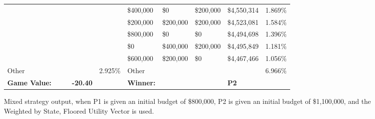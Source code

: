 \documentclass[11pt]{article}
\begin{document}
\begin{figure}
\begin{tabular}{ |p{1.0cm}p{1.0cm}p{1.0cm}p{2.0cm}|p{1.0cm}||p{1.0cm}p{1.0cm}p{1.0cm}p{2.0cm}|p{1.0cm}|}
&&&&                                                & \$400,000 & \$0& \$200,000 & \$4,550,314  & 1.869\% \\
&&&&                                                & \$200,000& \$200,000& \$200,000 & \$4,523,081  & 1.584\% \\
&&&&                                                & \$800,000 & \$0 & \$0 & \$4,494,698  & 1.396\% \\
&&&&                                                & \$0& \$400,000& \$200,000 & \$4,495,849  & 1.181\% \\
&&&&                                                & \$600,000& \$200,000 & \$0 & \$4,467,466  & 1.056\% \\
\hline
Other &&&& 2.925\% & Other &&&& 6.966\% \\
\hline
\small \textbf{Game Value:} &&& \small \textbf{-20.40} && \small \textbf{Winner:} &&& \small \textbf{P2}&\\
\hline
\end{tabular}
\caption{Mixed strategy output, when P1 is given an initial budget of \$800,000, P2 is given an initial budget of \$1,100,000, and the Weighted by State, Floored Utility Vector is used.}
\label{8v11table.2}
\end{figure}
\end{document}
